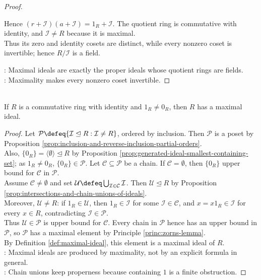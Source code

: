 \begin{theorem}
\begin{proof}
\begin{enumerate}[label=\roman*.]
Hence $(r+\mathcal{I})(a+\mathcal{I})=1_R+\mathcal{I}$. The quotient ring is commutative with identity, and $\mathcal{I}\neq R$ because it is maximal.\\
Thus its zero and identity cosets are distinct, while every nonzero coset is invertible; hence $R/\mathcal{I}$ is a field.
\end{enumerate}
: Maximal ideals are exactly the proper ideals whose quotient rings are fields.\\
: Maximality makes every nonzero coset invertible.
\end{proof}
\end{theorem}

\begin{theorem} \label{thm:maximal-ideals-exist} \\
If $R$ is a commutative ring with identity and $1_R\neq0_R$, then $R$ has a maximal ideal.
\begin{proof}
Let $\mathcal{P}\defeq\{\mathcal{I}\trianglelefteq R:\mathcal{I}\neq R\}$, ordered by inclusion. Then $\mathcal{P}$ is a poset by Proposition \ref{prop:inclusion-and-reverse-inclusion-partial-orders}.\\
Also, $\{0_R\}=\langle\emptyset\rangle\trianglelefteq R$ by Proposition \ref{prop:generated-ideal-smallest-containing-set}; as $1_R\neq0_R$, $\{0_R\}\in\mathcal{P}$. Let $\mathcal{C}\subseteq\mathcal{P}$ be a chain. If $\mathcal{C}=\emptyset$, then $\{0_R\}$ upper bound for $\mathcal{C}$ in $\mathcal{P}$.\\
Assume $\mathcal{C}\neq\emptyset$ and set $\mathcal{U}\defeq\bigcup_{\mathcal{I}\in\mathcal{C}}\mathcal{I}$. Then $\mathcal{U}\trianglelefteq R$ by Proposition \ref{prop:intersections-and-chain-unions-of-ideals}.\\
Moreover, $\mathcal{U}\neq R$: if $1_R\in\mathcal{U}$, then $1_R\in\mathcal{I}$ for some $\mathcal{I}\in\mathcal{C}$, and $x=x1_R\in\mathcal{I}$ for every $x\in R$, contradicting $\mathcal{I}\in\mathcal{P}$.\\
Thus $\mathcal{U}\in\mathcal{P}$ is upper bound for $\mathcal{C}$. Every chain in $\mathcal{P}$ hence has an upper bound in $\mathcal{P}$, so $\mathcal{P}$ has a maximal element by Principle \ref{princ:zorns-lemma}.\\
By Definition \ref{def:maximal-ideal}, this element is a maximal ideal of $R$.\\
: Maximal ideals are produced by maximality, not by an explicit formula in general.\\
: Chain unions keep properness because containing $1$ is a finite obstruction.
\end{proof}
\end{theorem}
